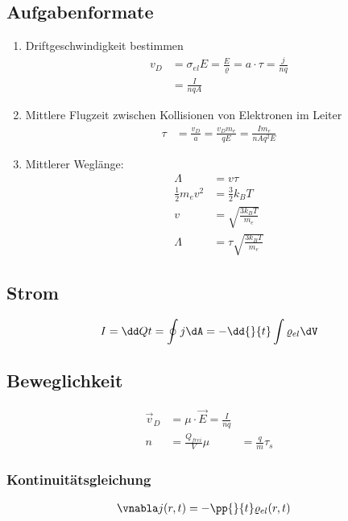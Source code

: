 \documentclass[twocolumn]{summery_3.1}
\begin{document}
\subsection{Aufgabenformate}
\begin{enumerate}
    \item Driftgeschwindigkeit bestimmen
    \begin{align*}
        v_D &= \sigma_{el} E = \frac{E}{\varrho} =  a\cdot \tau =\frac{j}{n q} \\
        &= \frac{I}{n q A}
    \end{align*}
    \item Mittlere Flugzeit zwischen Kollisionen von Elektronen im Leiter
    \begin{align*}
        \tau &= \frac{v_D}{a} = \frac{v_D m_e}{qE} 
        =\frac{I m_e}{n A q^2 E} 
    \end{align*}
    \item Mittlerer Weglänge:
    \begin{align*}
        \Lambda &=  v \tau\\
        \frac{1}{2}m_e v^2 &= \frac{3}{2}k_B T\\
        v &= \sqrt{\frac{3k_B T}{m_e }}\\
        \Lambda &= \tau \sqrt{\frac{3k_B T}{m_e }}
    \end{align*}
\end{enumerate}

\subsection{Strom}
\begin{align*}
    I &= \dd Qt = \oint j \dA = - \dd{}{t}\int \varrho_{el} \dV\\
\end{align*}

\subsection{Beweglichkeit}
\begin{align*}
    \vec v_D &= \mu \cdot \vec E = \frac{I}{n q}\\ %
    n &= \frac{Q_{frei}}{V}
    \mu &= \frac{ q }{m } \tau_s %
\end{align*}

\subsubsection{Kontinuitätsgleichung}
\begin{align*}
    \vnabla j(r,t) &= - \pp{}{t} \varrho_{el}(r,t)
\end{align*}
\end{document}
